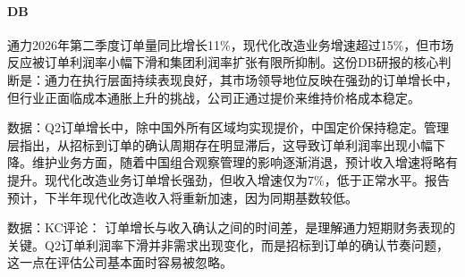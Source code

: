 \documentclass[11pt]{ctexart}
\begin{document}
\paragraph{DB} 通力2026年第二季度订单量同比增长11\%，现代化改造业务增速超过15\%，但市场反应被订单利润率小幅下滑和集团利润率扩张有限所抑制。这份DB研报的核心判断是：通力在执行层面持续表现良好，其市场领导地位反映在强劲的订单增长中，但行业正面临成本通胀上升的挑战，公司正通过提价来维持价格成本稳定。
{\small\color{refgray}数据：Q2订单增长中，除中国外所有区域均实现提价，中国定价保持稳定。管理层指出，从招标到订单的确认周期存在明显滞后，这导致订单利润率出现小幅下降。维护业务方面，随着中国组合观察管理的影响逐渐消退，预计收入增速将略有提升。现代化改造业务订单增长强劲，但收入增速仅为7\%，低于正常水平。报告预计，下半年现代化改造收入将重新加速，因为同期基数较低。\par}
{\small\color{refgray}数据：KC评论： 订单增长与收入确认之间的时间差，是理解通力短期财务表现的关键。Q2订单利润率下滑并非需求出现变化，而是招标到订单的确认节奏问题，这一点在评估公司基本面时容易被忽略。\par}
\end{document}
